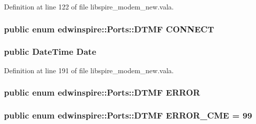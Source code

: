 Definition at line 122 of file libspire\-\_\-modem\-\_\-new.\-vala.

\hypertarget{namespaceedwinspire_1_1_ports_aff135858aa5a9cc89df1ab5c7be36d57}{
\subsubsection[{C\-O\-N\-N\-E\-C\-T}]{\setlength{\rightskip}{0pt plus 5cm}public enum {\bf edwinspire\-::\-Ports\-::\-D\-T\-M\-F}
			 C\-O\-N\-N\-E\-C\-T}}\label{namespaceedwinspire_1_1_ports_aff135858aa5a9cc89df1ab5c7be36d57}
\hypertarget{namespaceedwinspire_1_1_ports_a506e2d03085ed736361fd15035c2e456}{
\subsubsection[{Date}]{\setlength{\rightskip}{0pt plus 5cm}public Date\-Time Date}}\label{namespaceedwinspire_1_1_ports_a506e2d03085ed736361fd15035c2e456}


Definition at line 191 of file libspire\-\_\-modem\-\_\-new.\-vala.

\hypertarget{namespaceedwinspire_1_1_ports_ab432ddd57eaa78866b8ce320fdb31d01}{
\subsubsection[{E\-R\-R\-O\-R}]{\setlength{\rightskip}{0pt plus 5cm}public enum {\bf edwinspire\-::\-Ports\-::\-D\-T\-M\-F} 
			 E\-R\-R\-O\-R}}\label{namespaceedwinspire_1_1_ports_ab432ddd57eaa78866b8ce320fdb31d01}
\hypertarget{namespaceedwinspire_1_1_ports_aa67849e33e71e0685dee31059d242ac3}{
\subsubsection[{E\-R\-R\-O\-R\-\_\-\-C\-M\-E}]{\setlength{\rightskip}{0pt plus 5cm}public enum {\bf edwinspire\-::\-Ports\-::\-D\-T\-M\-F} E\-R\-R\-O\-R\-\_\-\-C\-M\-E = 99}}\label{namespaceedwinspire_1_1_ports_aa67849e33e71e0685dee31059d242ac3}


